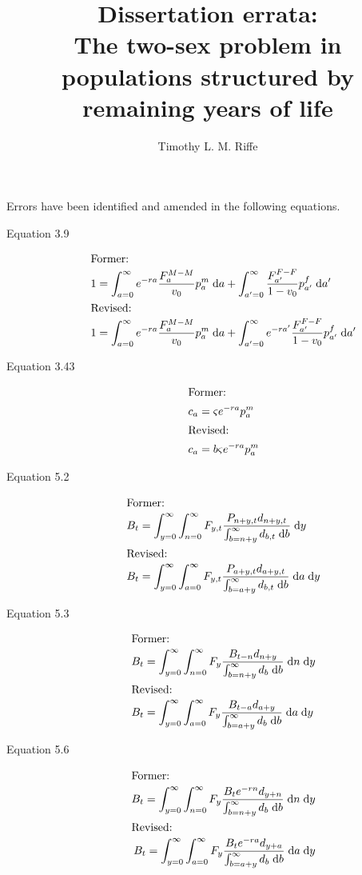 \documentclass{article}
\newcommand{\dd}{\; \mathrm{d}}
\begin{document}
\title{Dissertation errata: \\The two-sex problem in populations structured by
remaining years of life}
\author{Timothy L. M. Riffe}
\maketitle

Errors have been identified and amended in the following equations.
\begin{description}
\item[Equation 3.9]
\begin{align}
\intertext{Former:}
1 &= \int _{a=0} ^\infty e^{-r a} \frac{F_a ^{M-M}}{v_0} p_a^m \dd a + \int
_{a'=0} ^\infty \frac{F_{a'} ^{F-F}}{1 - v_0} p_{a'}^f \dd a' \notag \\
\intertext{Revised:}
1 &= \int _{a=0} ^\infty e^{-r a} \frac{F_a ^{M-M}}{v_0} p_a^m \dd a + \int
_{a'=0} ^\infty e^{-r a'} \frac{F_{a'} ^{F-F}}{1 - v_0} p_{a'}^f \dd a' \notag
\end{align}
\item[Equation 3.43]
\begin{align}
\intertext{Former:}
c_a &=  \varsigma  e^{-ra} p_a^m \notag \\
\intertext{Revised:}
c_a &=  b\varsigma  e^{-ra} p_a^m \notag \\
\end{align}
\item[Equation 5.2] 
\begin{align}
\intertext{Former:}
B_t &= \int_{y=0}^\infty \int_{n=0}^\infty F_{y,t}
\frac{P_{n+y,t}d_{n+y,t}}{\int_{b=n+y}^\infty d_{b,t} \dd b} \dd y \notag\\
\intertext{Revised:}
B_t &= \int_{y=0}^\infty \int_{a=0}^\infty F_{y,t}
\frac{P_{a+y,t}d_{a+y,t}}{\int_{b=a+y}^\infty d_{b,t} \dd b} \dd a \dd y \notag
\end{align}
\item[Equation 5.3]
\begin{align}
\intertext{Former:}
B_t &= \int_{y=0}^\infty \int_{n=0}^\infty F_y
\frac{B_{t-n}d_{n+y}}{\int_{b=n+y}^\infty d_b \dd b} \dd n \dd y \notag\\
\intertext{Revised:}
B_t &= \int_{y=0}^\infty \int_{a=0}^\infty F_y
\frac{B_{t-a}d_{a+y}}{\int_{b=a+y}^\infty d_b \dd b} \dd a \dd y \notag
\end{align}
\item[Equation 5.6]
\begin{align}
\intertext{Former:}
B_t = \int_{y=0}^\infty \int_{n=0}^\infty F_y
\frac{B_{t}e^{-rn}d_{y+n}}{\int_{b=n+y}^\infty d_b \dd b} \dd n \dd y \notag\\
\intertext{Revised:}
B_t = \int_{y=0}^\infty \int_{a=0}^\infty F_y
\frac{B_{t}e^{-ra}d_{y+a}}{\int_{b=a+y}^\infty d_b \dd b} \dd a \dd y \notag
\end{align}
\end{description}
\end{document}
